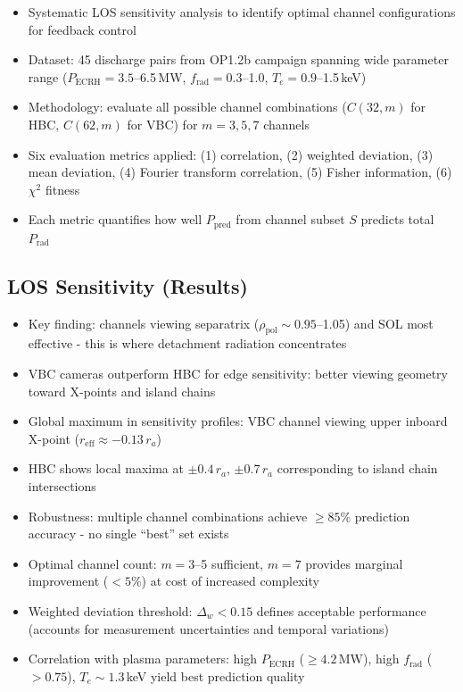 \documentclass[11pt,a4paper]{article}
\begin{document}
\begin{itemize}
\item Systematic LOS sensitivity analysis to identify optimal channel configurations for feedback control
\item Dataset: 45 discharge pairs from OP1.2b campaign spanning wide parameter range ($P_{\text{ECRH}}=3.5$--6.5\,MW, $f_{\text{rad}}=0.3$--1.0, $T_e=0.9$--1.5\,keV)
\item Methodology: evaluate all possible channel combinations ($C(32,m)$ for HBC, $C(62,m)$ for VBC) for $m=3,5,7$ channels
\item Six evaluation metrics applied: (1) correlation, (2) weighted deviation, (3) mean deviation, (4) Fourier transform correlation, (5) Fisher information, (6) $\chi^2$ fitness
\item Each metric quantifies how well $P_{\text{pred}}$ from channel subset $S$ predicts total $P_{\text{rad}}$
\end{itemize}

\subsection{LOS Sensitivity (Results)}

\begin{itemize}
\item Key finding: channels viewing separatrix ($\rho_{\text{pol}}\sim0.95$--1.05) and SOL most effective - this is where detachment radiation concentrates
\item VBC cameras outperform HBC for edge sensitivity: better viewing geometry toward X-points and island chains
\item Global maximum in sensitivity profiles: VBC channel viewing upper inboard X-point ($r_{\text{eff}}\approx-0.13\,r_a$)
\item HBC shows local maxima at $\pm0.4\,r_a$, $\pm0.7\,r_a$ corresponding to island chain intersections
\item Robustness: multiple channel combinations achieve $\geq85\%$ prediction accuracy - no single ``best'' set exists
\item Optimal channel count: $m=3$--5 sufficient, $m=7$ provides marginal improvement ($<5\%$) at cost of increased complexity
\item Weighted deviation threshold: $\Delta_w<0.15$ defines acceptable performance (accounts for measurement uncertainties and temporal variations)
\item Correlation with plasma parameters: high $P_{\text{ECRH}}$ ($\geq4.2$\,MW), high $f_{\text{rad}}$ ($>0.75$), $T_e\sim1.3$\,keV yield best prediction quality
\end{itemize}
\end{document}
